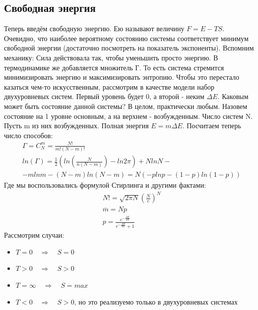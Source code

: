 \documentclass[a4paper, 12pt]{article}
\newcommand{\qrq}
{\ensuremath{\quad \Rightarrow \quad}} %
\begin{document}
	\subsection{Свободная энергия}
	Теперь введём свободную энергию. Ею называют величину $F =E-TS$. Очевидно, что наиболее вероятному состоянию системы соответствует минимум свободной энергии (достаточно посмотреть на показатель экспоненты). Вспомним механику: Сила действовала так, чтобы уменьшить просто энергию. В термодинамике же добавляется множитель Г. То есть система стремится минимизировать энергию и максимизировать энтропию. Чтобы это перестало казаться чем-то искусственным, рассмотрим в качестве модели набор двухуровневых систем. Первый уровень будет 0, а второй - неким $\Delta E$.  Каковым может быть состояние данной системы? В целом, практически любым. Назовем состояние на 1 уровне основным, а на верхнем - возбужденным. Число систем N. Пусть m из них возбужденных. Полная энергия $E = m \Delta E$. Посчитаем теперь число способов:
	\begin{equation*}
		\begin{aligned}
			& \Gamma = C_{N}^{m} = \frac{N!}{m!(N-m)!}                           \\
			& ln(\Gamma) = \frac{1}{2 }(ln(\frac{N}{n(N-m)})- ln 2 \pi) + NlnN - \\
			& - mlnm - (N-m)ln(N-m) = N( -plnp - (1-p)ln(1-p))                   
		\end{aligned}
	\end{equation*}
	Где мы воспользовались формулой Стирлинга  и другими фактами:
	\begin{equation*}
		\begin{aligned}
			& N!=\sqrt{2 \pi N}(\frac{N}{e})^{N}                                \\
			& \overline{m} = Np                                                 \\
			& p = \frac{e^{-\frac{\Delta E}{kT}}}{e^{-\frac{\Delta E}{kT}} + 1} 
		\end{aligned}
	\end{equation*}
	Рассмотрим случаи:
	\begin{itemize}
		\item $T = 0 \qrq S = 0$
		\item $ T > 0 \qrq S>0$
		\item $T = \infty \qrq S = max$
		\item $T<0 \qrq S>0$, но это реализуемо только в двухуровневых системах
	\end{itemize}
\end{document}
